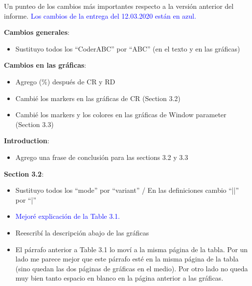 \clearpage
Un punteo de los cambios más importantes respecto a la versión anterior del informe. \textcolor{blue}{Los cambios de la entrega del 12.03.2020 están en azul.}


\vspace{+5pt}
\textbf{Cambios generales}:
\vspace{-10pt}
\begin{itemize}
    \item Sustituyo todos los “CoderABC” por “ABC” (en el texto y en las gráficas)
\end{itemize}


\vspace{+5pt}
\textbf{Cambios en las gráficas}:
\vspace{-10pt}
\begin{itemize}
    \item Agrego (\%) después de CR y RD
    \item Cambié los markers en las gráficas de CR (Section 3.2) 
    \item Cambié los markers y los colores en las gráficas de Window parameter (Section 3.3) 
\end{itemize}


\vspace{+5pt}
\textbf{Introduction}:
\vspace{-10pt}
\begin{itemize}
    \item Agrego una frase de conclusión para las sections 3.2 y 3.3
\end{itemize}


\vspace{+5pt}
\textbf{Section 3.2}:
\vspace{-10pt}
\begin{itemize}
    \item Sustituyo todos los “mode” por “variant” / En las definiciones cambio “||” por “|”
    \item \textcolor{blue}{Mejoré explicación de la Table 3.1.}
    \item Reescribí la descripción abajo de las gráficas
    \item El párrafo anterior a Table 3.1 lo moví a la misma página de la tabla. Por un lado me parece mejor que este párrafo esté en la misma página de la tabla (sino quedan las dos páginas de gráficas en el medio). Por otro lado no queda muy bien tanto espacio en blanco en la página anterior a las gráficas.
\end{itemize}


